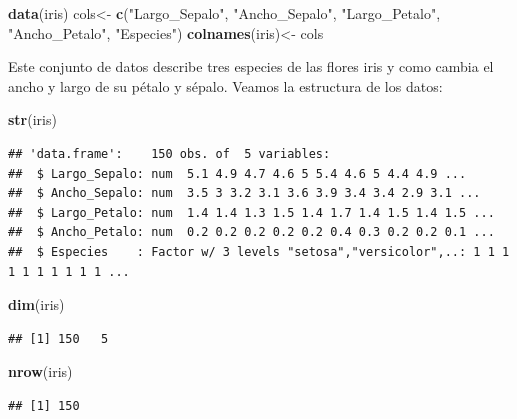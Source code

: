 \documentclass[
]{book}
\newenvironment{Shaded}{\begin{snugshade}}{\end{snugshade}}
\newcommand{\FunctionTok}[1]{\textcolor[rgb]{0.13,0.29,0.53}{\textbf{#1}}}
\newcommand{\NormalTok}[1]{#1}
\newcommand{\OtherTok}[1]{\textcolor[rgb]{0.56,0.35,0.01}{#1}}
\newcommand{\StringTok}[1]{\textcolor[rgb]{0.31,0.60,0.02}{#1}}
\begin{document}
\begin{Shaded}
\begin{Highlighting}[]
\FunctionTok{data}\NormalTok{(iris)}
\NormalTok{cols}\OtherTok{\textless{}{-}} \FunctionTok{c}\NormalTok{(}\StringTok{"Largo\_Sepalo"}\NormalTok{, }\StringTok{"Ancho\_Sepalo"}\NormalTok{, }\StringTok{"Largo\_Petalo"}\NormalTok{, }\StringTok{"Ancho\_Petalo"}\NormalTok{, }\StringTok{"Especies"}\NormalTok{)}
\FunctionTok{colnames}\NormalTok{(iris)}\OtherTok{\textless{}{-}}\NormalTok{ cols}
\end{Highlighting}
\end{Shaded}

Este conjunto de datos describe tres especies de las flores iris y como cambia el ancho y largo de su pétalo y sépalo.
Veamos la estructura de los datos:

\begin{Shaded}
\begin{Highlighting}[]
\FunctionTok{str}\NormalTok{(iris)}
\end{Highlighting}
\end{Shaded}

\begin{verbatim}
## 'data.frame':    150 obs. of  5 variables:
##  $ Largo_Sepalo: num  5.1 4.9 4.7 4.6 5 5.4 4.6 5 4.4 4.9 ...
##  $ Ancho_Sepalo: num  3.5 3 3.2 3.1 3.6 3.9 3.4 3.4 2.9 3.1 ...
##  $ Largo_Petalo: num  1.4 1.4 1.3 1.5 1.4 1.7 1.4 1.5 1.4 1.5 ...
##  $ Ancho_Petalo: num  0.2 0.2 0.2 0.2 0.2 0.4 0.3 0.2 0.2 0.1 ...
##  $ Especies    : Factor w/ 3 levels "setosa","versicolor",..: 1 1 1 1 1 1 1 1 1 1 ...
\end{verbatim}

\begin{Shaded}
\begin{Highlighting}[]
\FunctionTok{dim}\NormalTok{(iris)}
\end{Highlighting}
\end{Shaded}

\begin{verbatim}
## [1] 150   5
\end{verbatim}

\begin{Shaded}
\begin{Highlighting}[]
\FunctionTok{nrow}\NormalTok{(iris)}
\end{Highlighting}
\end{Shaded}

\begin{verbatim}
## [1] 150
\end{verbatim}
\end{document}
